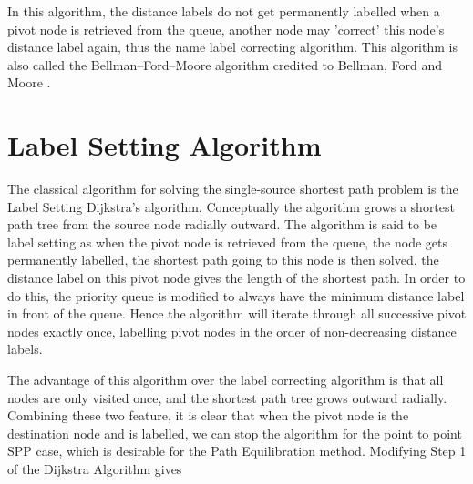 In this algorithm,
the distance labels do not get permanently labelled when a pivot node is retrieved from the queue,
another node may 'correct' this node's distance label again,
thus the name label correcting algorithm.
This algorithm is also called the Bellman–Ford–Moore algorithm credited to Bellman, Ford and Moore \citep{Bellman,Ford, Moore}.


\section{Label Setting Algorithm}
\label{section:labelsettingalgorithm}
The classical algorithm for solving the single-source shortest path problem is the Label Setting Dijkstra's algorithm.
Conceptually the algorithm grows a shortest path tree from the source node radially outward.
The algorithm is said to be label setting as when the pivot node is retrieved from the queue,
the node gets permanently labelled,
the shortest path going to this node is then solved,
the distance label on this pivot node gives the length of the shortest path.
In order to do this, 
the priority queue is modified to always have the minimum distance label in front of the queue.
Hence the algorithm will iterate through all successive pivot nodes exactly once,
labelling pivot nodes in the order of non-decreasing distance labels.



The advantage of this algorithm over the label correcting algorithm is
that all nodes are only visited once,
and the shortest path tree grows outward radially.
Combining these two feature,
it is clear that when the pivot node is the destination node and is 
labelled,
we can stop the algorithm for the point to point SPP case,
which is desirable for the Path Equilibration method.
Modifying Step 1 of the Dijkstra Algorithm gives

